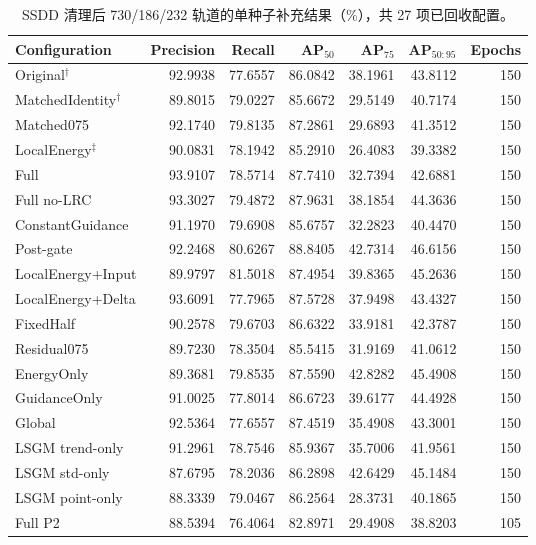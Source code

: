 \documentclass[journal]{IEEEtran}
\begin{document}
\begin{table}[!t]
\centering
\small
\setlength{\tabcolsep}{3pt}
\caption{SSDD 清理后 730/186/232 轨道的单种子补充结果（\%），共 27 项已回收配置。}
\label{tab:ssdd_seed0_controls}
\begin{tabular*}{\textwidth}{@{\extracolsep{\fill}}lrrrrrr}
\toprule
Configuration & Precision & Recall & AP$_{50}$ & AP$_{75}$ & AP$_{50:95}$ & Epochs \\
\midrule
Original$^{\dagger}$
& 92.9938 & 77.6557 & 86.0842 & 38.1961 & 43.8112 & 150 \\
MatchedIdentity$^{\dagger}$
& 89.8015 & 79.0227 & 85.6672 & 29.5149 & 40.7174 & 150 \\
Matched075
& 92.1740 & 79.8135 & 87.2861 & 29.6893 & 41.3512 & 150 \\
LocalEnergy$^{\ddagger}$
& 90.0831 & 78.1942 & 85.2910 & 26.4083 & 39.3382 & 150 \\
Full
& 93.9107 & 78.5714 & 87.7410 & 32.7394 & 42.6881 & 150 \\
Full no-LRC
& 93.3027 & 79.4872 & 87.9631 & 38.1854 & 44.3636 & 150 \\
ConstantGuidance
& 91.1970 & 79.6908 & 85.6757 & 32.2823 & 40.4470 & 150 \\
Post-gate
& 92.2468 & 80.6267 & 88.8405 & 42.7314 & 46.6156 & 150 \\
LocalEnergy+Input
& 89.9797 & 81.5018 & 87.4954 & 39.8365 & 45.2636 & 150 \\
LocalEnergy+Delta
& 93.6091 & 77.7965 & 87.5728 & 37.9498 & 43.4327 & 150 \\
FixedHalf
& 90.2578 & 79.6703 & 86.6322 & 33.9181 & 42.3787 & 150 \\
Residual075
& 89.7230 & 78.3504 & 85.5415 & 31.9169 & 41.0612 & 150 \\
EnergyOnly
& 89.3681 & 79.8535 & 87.5590 & 42.8282 & 45.4908 & 150 \\
GuidanceOnly
& 91.0025 & 77.8014 & 86.6723 & 39.6177 & 44.4928 & 150 \\
Global
& 92.5364 & 77.6557 & 87.4519 & 35.4908 & 43.3001 & 150 \\
LSGM trend-only
& 91.2961 & 78.7546 & 85.9367 & 35.7006 & 41.9561 & 150 \\
LSGM std-only
& 87.6795 & 78.2036 & 86.2898 & 42.6429 & 45.1484 & 150 \\
LSGM point-only
& 88.3339 & 79.0467 & 86.2564 & 28.3731 & 40.1865 & 150 \\
Full P2
& 88.5394 & 76.4064 & 82.8971 & 29.4908 & 38.8203 & 105 \\

\end{tabular*}
\end{table}
\end{document}
